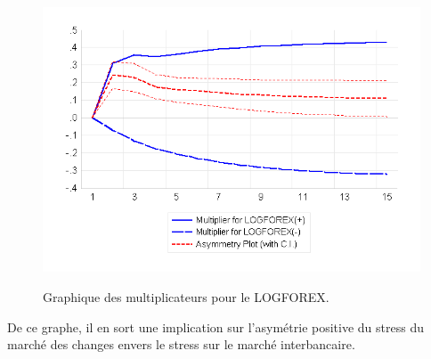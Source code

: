\begin{figure}[H]
    \centering
    \caption{Graphique des multiplicateurs pour le LOGFOREX.}
\includegraphics{figures/logequity.png}
    \label{fig:msih_resids}
\end{figure}

De ce graphe, il en sort une implication sur l'asymétrie positive du stress du marché des changes envers le stress sur le marché interbancaire.

